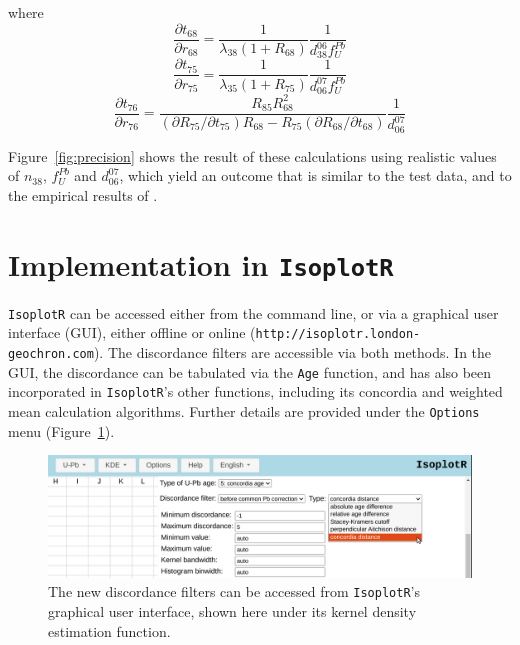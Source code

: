 \documentclass[gchron, manuscript]{copernicus}
\begin{document}
where
\begin{equation}
    \frac{\partial{t_{68}}}{\partial{r_{68}}} = 
    \frac{1}{\lambda_{38}(1+R_{68})} \frac{1}{d^{06}_{38}f^{Pb}_{U}}
\end{equation}
\begin{equation}  
    \frac{\partial{t_{75}}}{\partial{r_{75}}} = 
    \frac{1}{\lambda_{35}(1+R_{75})} \frac{1}{d^{07}_{06}f^{Pb}_{U}}
\end{equation}
\begin{equation}  
  \frac{\partial{t_{76}}}{\partial{r_{76}}} =
  \frac{R_{85}R_{68}^2}
       {(\partial{R_{75}}/\partial{t_{75}})R_{68} -
         R_{75}(\partial{R_{68}}/\partial{t_{68}})}
       \frac{1}{d^{07}_{06}}
\end{equation}

Figure~\ref{fig:precision} shows the result of these calculations
using realistic values of $n_{38}$, $f^{Pb}_{U}$ and $d^{07}_{06}$,
which yield an outcome that is similar to the test data, and to the
empirical results of \citet{zimmermann2018}.

\section{Implementation in \texttt{IsoplotR}}
\label{app:IsoplotR}

\texttt{IsoplotR} can be accessed either from the command line, or via
a graphical user interface (GUI), either offline or online
(\texttt{http://isoplotr.london-geochron.com}).  The discordance
filters are accessible via both methods. In the GUI, the discordance
can be tabulated via the \texttt{Age} function, and has also been
incorporated in \texttt{IsoplotR}'s other functions, including its
concordia and weighted mean calculation algorithms.  Further details
are provided under the \texttt{Options} menu
(Figure~\ref{fig:IsoplotR}).

\begin{figure}
  \includegraphics[width=12cm]{IsoplotR.png}
  \caption{The new discordance filters can be accessed from
    \texttt{IsoplotR}'s graphical user interface, shown here under its
    kernel density estimation function.}
  \label{fig:IsoplotR}
\end{figure}
\end{document}
